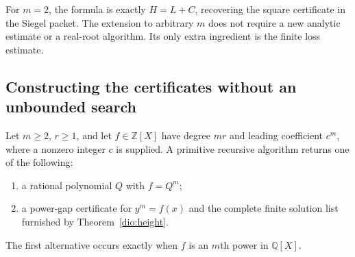 For $m=2$, the formula is exactly $H=L+C$, recovering the square
certificate in the Siegel packet.  The extension to arbitrary $m$ does
not require a new analytic estimate or a real-root algorithm.  Its only
extra ingredient is the finite loss estimate.

\subsection{Constructing the certificates without an unbounded search}

\begin{theorem}
\label{dio:completion}
Let $m\geq2$, $r\geq1$, and let $f\in\mathbb Z[X]$ have degree $mr$
and leading coefficient $c^m$, where a nonzero integer $c$ is supplied.
A primitive recursive algorithm returns one of the following:
\begin{enumerate}
 \item a rational polynomial $Q$ with $f=Q^m$;
 \item a power-gap certificate for $y^m=f(x)$ and the complete finite
       solution list furnished by Theorem~\ref{dio:height}.
\end{enumerate}
The first alternative occurs exactly when $f$ is an $m$th power in
$\mathbb Q[X]$.
\end{theorem}
